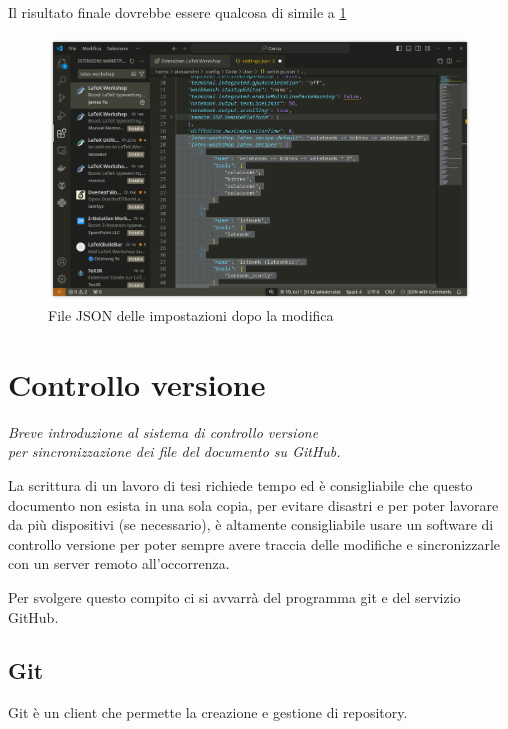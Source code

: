 \documentclass[envcountsame,envcountchap]{svmono}
\begin{document}
Il risultato finale dovrebbe essere qualcosa di simile a \ref{json_impostazioni_nuovo}
\begin{figure}[H]
    \centering
    \includegraphics[width=\linewidth]{images/vscode/vscode_settings_json2.png}
    \caption{File JSON delle impostazioni dopo la modifica}
    \label{json_impostazioni_nuovo}
\end{figure}


\chapter{Controllo versione} \label{Cap.2}

\vspace{2cm}

\begin{flushright}
\textit{Breve introduzione al sistema di controllo versione\\ per sincronizzazione dei file del documento su GitHub.}
\end{flushright}

\vspace{0.5cm}

La scrittura di un lavoro di tesi richiede tempo ed è consigliabile che questo 
documento non esista in una sola copia, per evitare disastri e per poter lavorare 
da più dispositivi (se necessario), è altamente consigliabile usare un software
di controllo versione per poter sempre avere traccia delle modifiche e sincronizzarle
con un server remoto all'occorrenza.

Per svolgere questo compito ci si avvarrà del programma git e del servizio GitHub.

\section{Git}
Git è un client che permette la creazione e gestione di repository.
\end{document}
